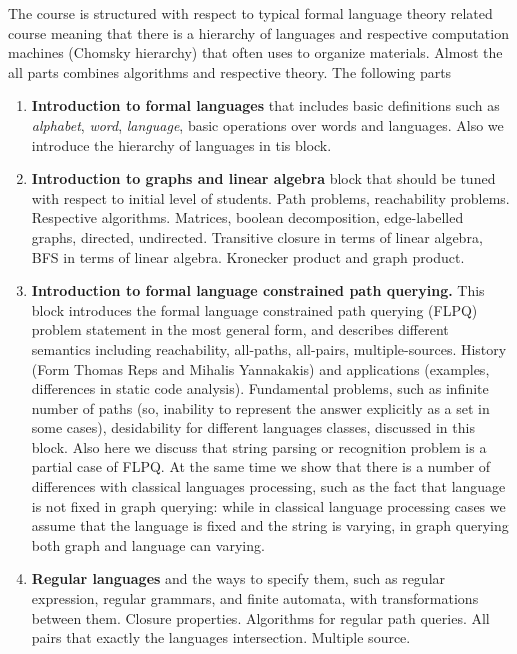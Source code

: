 \documentclass[sigconf]{acmart}
\begin{document}
The course is structured with respect to typical formal language theory related course meaning that there is a hierarchy of languages and respective computation machines (Chomsky hierarchy) that often uses to organize materials. 
Almost the all parts combines algorithms and respective theory.
The following parts
\begin{enumerate}
  \item \label{fl_intro} \textbf{Introduction to formal languages} that includes basic definitions such as \emph{alphabet}, \emph{word}, \emph{language}, basic operations over words and languages. 
  Also we introduce the hierarchy of languages in tis block.
  
  \item \label{graphs_intro} \textbf{Introduction to graphs and linear algebra} block that should be tuned with respect to initial level of students.
  Path problems, reachability problems. Respective algorithms. 
  Matrices, boolean decomposition, edge-labelled graphs, directed, undirected. 
  Transitive closure in terms of linear algebra, BFS in terms of linear algebra.
  Kronecker product and graph product.
  
  \item \label{flpq_intro} \textbf{Introduction to formal language constrained path querying.} 
  This block introduces the formal language constrained path querying (FLPQ)~\cite{!!!} problem statement in the most general form, and describes different semantics including reachability, all-paths, all-pairs, multiple-sources. 
  History (Form Thomas Reps and Mihalis Yannakakis) and applications (examples, differences in static code analysis). 
  Fundamental problems, such as infinite number of paths (so, inability to represent the answer explicitly as a set in some cases), desidability for different languages classes, discussed in this block. 
  Also here we discuss that string parsing or recognition problem is a partial case of FLPQ. 
  At the same time we show that there is a number of differences with classical languages processing, such as the fact that language is not fixed in graph querying: while in classical language processing cases we assume that the language is fixed and the string is varying, in graph querying both graph and language can varying.

  \item \label{regular_languages_intro} \textbf{Regular languages} and the ways to specify them, such as regular expression, regular grammars, and finite automata, with transformations between them.
  Closure properties. Algorithms for regular path queries.
  All pairs that exactly the languages intersection. 
  Multiple source.
  

\end{enumerate}
\end{document}
